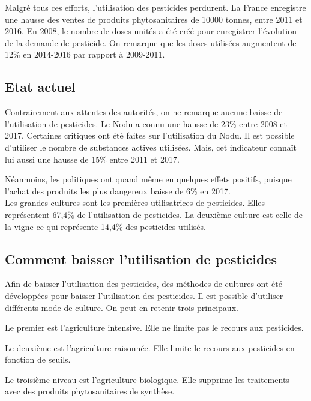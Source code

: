 \documentclass[11pt,]{article}
\begin{document}
Malgré tous ces efforts, l'utilisation des pesticides perdurent. La
France enregistre une hausse des ventes de produits phytosanitaires de
10000 tonnes, entre 2011 et 2016. En 2008, le nombre de doses unités a
été créé pour enregistrer l'évolution de la demande de pesticide. On
remarque que les doses utilisées augmentent de 12\% en 2014-2016 par
rapport à 2009-2011.

\hypertarget{etat-actuel}{%
\subsection{Etat actuel}\label{etat-actuel}}

Contrairement aux attentes des autorités, on ne remarque aucune baisse
de l'utilisation de pesticides. Le Nodu a connu une hausse de 23\% entre
2008 et 2017. Certaines critiques ont été faites sur l'utilisation du
Nodu. Il est possible d'utiliser le nombre de substances actives
utilisées. Mais, cet indicateur connaît lui aussi une hausse de 15\%
entre 2011 et 2017.

Néanmoins, les politiques ont quand même eu quelques effets positifs,
puisque l'achat des produits les plus dangereux baisse de 6\% en 2017.\\
Les grandes cultures sont les premières utilisatrices de pesticides.
Elles représentent 67,4\% de l'utilisation de pesticides. La deuxième
culture est celle de la vigne ce qui représente 14,4\% des pesticides
utilisés.

\hypertarget{comment-baisser-lutilisation-de-pesticides}{%
\subsection{Comment baisser l'utilisation de
pesticides}\label{comment-baisser-lutilisation-de-pesticides}}

Afin de baisser l'utilisation des pesticides, des méthodes de cultures
ont été développées pour baisser l'utilisation des pesticides. Il est
possible d'utiliser différents mode de culture. On peut en retenir trois
principaux.

Le premier est l'agriculture intensive. Elle ne limite pas le recours
aux pesticides.

Le deuxième est l'agriculture raisonnée. Elle limite le recours aux
pesticides en fonction de seuils.

Le troisième niveau est l'agriculture biologique. Elle supprime les
traitements avec des produits phytosanitaires de synthèse.
\end{document}
